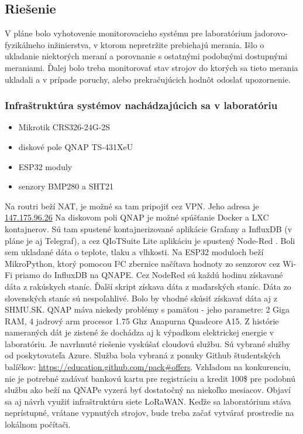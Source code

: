 

\subsection{Riešenie}
V pláne bolo vyhotovenie monitorovacieho systému pre laboratórium jadorovo-fyzikálneho inžinierstva, v ktorom nepretržite prebiehajú merania. Išlo o ukladanie niektorých meraní a porovnanie s ostatnými podobnými dostupnými meraniami. Ďalej bolo treba monitorovať stav strojov do ktorých sa tieto merania ukladali a v  prípade poruchy, alebo prekračujúcich hodnôt odoslať upozornenie.
\subsubsection{Infraštruktúra systémov nachádzajúcich sa v laboratóriu}
\begin{multicols}{2}
    \begin{itemize}
        \item Mikrotik CRS326-24G-2S
        \item diskové pole QNAP TS-431XeU
        \item ESP32 moduly
        \item senzory BMP280 a SHT21 
    \end{itemize}
\end{multicols}
Na routri beží NAT, je možné sa tam pripojiť cez VPN. Jeho adresa je \url{147.175.96.26} Na diskovom poli QNAP je možné spúšťanie Docker a LXC kontajnerov. Sú tam spustené kontajnerizované aplikácie Grafany a InfluxDB (v pláne je aj Telegraf), a cez QIoTSuite Lite aplikáciu je spustený Node-Red . Boli sem ukladané dáta o teplote, tlaku a vlhkosti. Na ESP32 moduloch beží MikroPython, ktorý pomocou I²C zbernice načítava hodnoty zo senzorov cez Wi-Fi priamo do InfluxDB na QNAPE. Cez NodeRed sú každú hodinu získavané dáta z rakúskych staníc. Ďalší skript získava dáta z maďarských staníc. Dáta zo slovenských staníc sú nespoľahlivé. Bolo by vhodné skúsiť získavať dáta aj z SHMU.SK. QNAP máva niekedy problémy s pamäťou - jeho parametre: 2 Giga RAM, 4 jadrový arm procesor 1.75 Ghz Anapurna Quadcore A15. Z histórie nameraných dát je zistené že dochádza aj k výpadkom elektrickej energie v laboratóriu. Je navrhnuté riešenie vyskúšať cloudovú službu. Sú vybrané služby od poskytovateľa  Azure. Služba bola vybraná z ponuky Github študentských balíčkov: \url{https://education.github.com/pack#offers}. Vzhľadom na konkurenciu, nie je potrebné zadávať bankovú kartu pre registráciu a  kredit 100\$ pre podobnú službu ako beží na QNAPe vyzerá byť dostatočný na niekoľko mesiacov. Objaví sa aj návrh využiť infraštruktúru siete LoRaWAN. Keďže sa laboratórium stáva neprístupné, vrátane vypnutých strojov, bude treba začať vytvárať prostredie na lokálnom počítači. 


